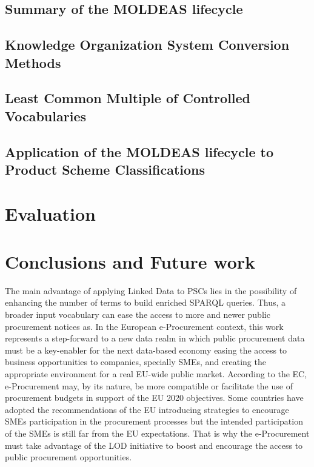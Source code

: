 \documentclass[preprint,12pt]{elsarticle}
\begin{document}
  \subsection{Summary of the MOLDEAS lifecycle}\label{sect:method}
  
  \subsection{Knowledge Organization System Conversion Methods}\label{sect:thesauri}
  
  \subsection{Least Common Multiple of Controlled Vocabularies}\label{sect:least}
  
  \subsection{Application of the MOLDEAS lifecycle to Product Scheme Classifications}\label{sect:use-moldeas}
  
\section{Evaluation}\label{sect:evaluation}

\section{Conclusions and Future work}\label{sect:conclusions}
The main advantage of applying Linked Data to PSCs lies in the possibility of enhancing the number of terms to 
build enriched SPARQL queries. Thus, a broader input vocabulary can ease the access to more and newer 
public procurement notices as. In the European e-Procurement context, this work represents 
a step-forward to a new data realm in which public procurement data must be a key-enabler for the next 
data-based economy easing the access to business opportunities to companies, specially SMEs, 
and creating the appropriate environment for a real EU-wide public market. According to the EC, e-Procurement may, 
by its nature, be more compatible or facilitate the use of procurement budgets in support of the 
EU 2020 objectives. Some countries have adopted the recommendations of the EU introducing strategies to encourage SMEs 
participation in the procurement processes but the intended participation of the SMEs is still far from the EU expectations. 
That is why the e-Procurement must take advantage of the LOD initiative to boost and encourage 
the access to public procurement opportunities.
\end{document}
